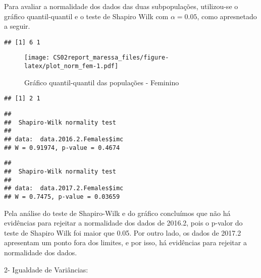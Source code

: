 \documentclass[]{article}
\newenvironment{Shaded}{\begin{snugshade}}{\end{snugshade}}
\newcommand{\DecValTok}[1]{\textcolor[rgb]{0.00,0.00,0.81}{#1}}
\newcommand{\FloatTok}[1]{\textcolor[rgb]{0.00,0.00,0.81}{#1}}
\newcommand{\KeywordTok}[1]{\textcolor[rgb]{0.13,0.29,0.53}{\textbf{#1}}}
\newcommand{\NormalTok}[1]{#1}
\newcommand{\OperatorTok}[1]{\textcolor[rgb]{0.81,0.36,0.00}{\textbf{#1}}}
\begin{document}
Para avaliar a normalidade dos dados das duas subpopulações, utilizou-se
o gráfico quantil-quantil e o teste de Shapiro Wilk com
\(\alpha = 0.05\), como apresnetado a seguir.

\begin{verbatim}
## [1] 6 1
\end{verbatim}

\begin{figure}
\centering
\texttt{[image: CS02report\_maressa\_files/figure-latex/plot\_norm\_fem-1.pdf]}
\caption{Gráfico quantil-quantil das populações - Feminino}
\end{figure}

\begin{verbatim}
## [1] 2 1
\end{verbatim}

\begin{Shaded}
\end{Shaded}

\begin{verbatim}
## 
##  Shapiro-Wilk normality test
## 
## data:  data.2016.2.Females$imc
## W = 0.91974, p-value = 0.4674
\end{verbatim}

\begin{Shaded}
\end{Shaded}

\begin{verbatim}
## 
##  Shapiro-Wilk normality test
## 
## data:  data.2017.2.Females$imc
## W = 0.7475, p-value = 0.03659
\end{verbatim}

Pela análise do teste de Shapiro-Wilk e do gráfico concluímos que não há
evidências para rejeitar a normalidade dos dados de 2016.2, pois o
p-valor do teste de Shapiro Wilk foi maior que 0.05. Por outro lado, os
dados de 2017.2 apresentam um ponto fora dos limites, e por isso, há
evidências para rejeitar a normalidade dos dados.

2- Igualdade de Variâncias:
\end{document}

